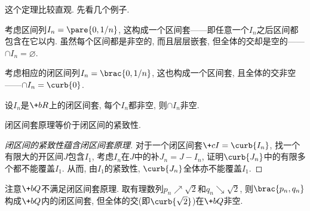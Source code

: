 \documentclass[hidelinks]{ctexart}
\begin{document}
这个定理比较直观. 先看几个例子.
\begin{sample}
    \begin{ex}
        考虑区间列$I_n=\pare{0,1/n}$, 这构成一个区间套——即任意一个$I_n$之后区间都包含在它以内. 虽然每个区间都是非空的, 而且层层嵌套, 但全体的交却是空的——$\cap I_n = \varnothing$.
    \end{ex}
    \begin{ex}
        考虑相应的闭区间列$I_n=\brac{0,1/n}$, 这也构成一个区间套, 且全体的交非空——$\cap I_n = \curb{0}$.
    \end{ex}
\end{sample}
\begin{finale}
    \begin{theorem}[闭区间套原理]
        设$I_n$是$\+bR$上的闭区间套, 每个$I_n$都非空, 则$\cap I_n$非空.
    \end{theorem}
    \begin{theorem}[等价性]
        闭区间套原理等价于闭区间的紧致性.
    \end{theorem}
\end{finale}
\begin{proof}[闭区间的紧致性蕴含闭区间套原理]
    对于一个闭区间套$\+cI = \curb{I_n}$, 找一个有限大的开区间$J$包含$I_1$, 考虑$I_n$在$J$中的补$J_n = J-I_n$, 证明$\curb{J_n}$中的有限多个都不能覆盖$I_1$. 从而, 由$I_1$的紧致性, $\curb{J_n}$全体亦不能覆盖$I_1$.
\end{proof}
\begin{sample}
    \begin{ex}
        注意$\+bQ$不满足闭区间套原理. 取有理数列$p_n\nearrow \sqrt{2}$和$q_n\searrow \sqrt{2}$, 则$\brac{p_n,q_n}$构成$\+bQ$内的闭区间套, 但全体的交(即$\curb{\sqrt{2}}$)在$\+bQ$非空.
    \end{ex}
\end{sample}
\end{document}
